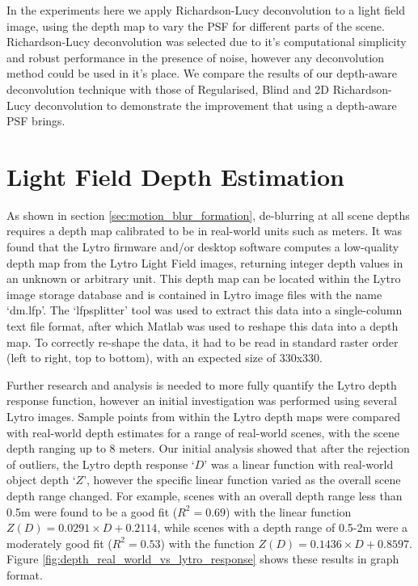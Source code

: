 In the experiments here we apply Richardson-Lucy deconvolution to a light field image, using the depth map to vary the PSF for different parts of the scene.
Richardson-Lucy deconvolution was selected due to it's computational simplicity and robust performance in the presence of noise, however any deconvolution method could be used in it's place.
We compare the results of our depth-aware deconvolution technique with those of Regularised, Blind and 2D Richardson-Lucy deconvolution to demonstrate the improvement that using a depth-aware PSF brings.

\section{Light Field Depth Estimation}
\label{sec:light_field_depth_estimation}

As shown in section \ref{sec:motion_blur_formation}, de-blurring at all scene depths requires a depth map calibrated to be in real-world units such as meters.
It was found that the Lytro firmware and/or desktop software computes a low-quality depth map from the Lytro Light Field images, returning integer depth values in an unknown or arbitrary unit.
This depth map can be located within the Lytro image storage database and is contained in Lytro image files with the name \enquote*{dm.lfp}.
The \enquote*{lfpsplitter} tool \cite{patel2013lfptools} was used to extract this data into a single-column text file format, after which Matlab was used to reshape this data into a depth map.
To correctly re-shape the data, it had to be read in standard raster order (left to right, top to bottom), with an expected size of 330x330.

Further research and analysis is needed to more fully quantify the Lytro depth response function, however an initial investigation was performed using several Lytro images.
Sample points from within the Lytro depth maps were compared with real-world depth estimates for a range of real-world scenes, with the scene depth ranging up to 8 meters.
Our initial analysis showed that after the rejection of outliers, the Lytro depth response \enquote*{$D$} was a linear function with real-world object depth \enquote*{$Z$}, however the specific linear function varied as the overall scene depth range changed.
For example, scenes with an overall depth range less than 0.5m were found to be a good fit ($R^2 = 0.69$) with the linear function $Z(D) = 0.0291 \times D + 0.2114$, while scenes with a depth range of 0.5-2m were a moderately good fit ($R^2 = 0.53$) with the function $Z(D) = 0.1436 \times D + 0.8597$.
Figure \ref{fig:depth_real_world_vs_lytro_response} shows these results in graph format.

